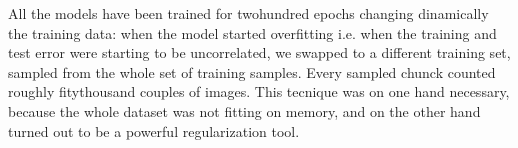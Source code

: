 All the models have been trained for twohundred epochs changing dinamically the training data: when the model started overfitting i.e. when the training and test error were starting to be uncorrelated, we swapped to a different training set, sampled from the whole set of training samples. Every sampled chunck counted roughly fitythousand couples of images. This tecnique was on one hand necessary, because the whole dataset was not fitting on memory, and on the other hand turned out to be a powerful regularization tool.
%

